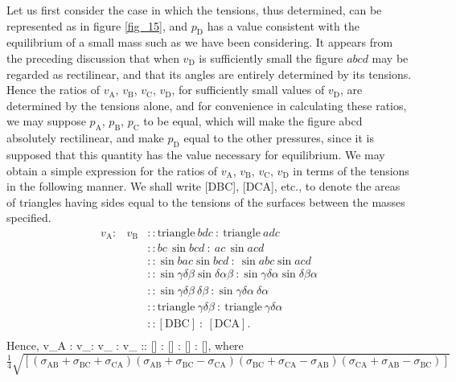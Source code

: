\documentclass[12pt]{memoir}
\newcommand{\dd}{\delta}
\begin{document}
Let us first consider the case in which the tensions, thus determined, can be represented as in figure \ref{fig_15}, and $p_\text{D}$ has a value consistent with the equilibrium of a small mass such as we have been considering. It appears from  the preceding discussion that when $v_\text{D}$ is sufficiently small the figure $abcd$ may be regarded as rectilinear, and that its angles are entirely determined by its tensions. Hence the ratios of $v_\text{A}$, $v_\text{B}$, $v_\text{C}$, $v_\text{D}$, for sufficiently small values of $v_\text{D}$, are determined by the tensions alone, and for convenience in calculating these ratios, we may suppose $p_\text{A}$, $p_\text{B}$, $p_\text{C}$ to be equal, which will make the figure abcd absolutely rectilinear, and make $p_\text{D}$ equal to the other pressures, since it is supposed that this quantity has the value necessary for equilibrium. We may obtain a simple expression for the ratios of $v_\text{A}$, $v_\text{B}$, $v_\text{C}$, $v_\text{D}$ in terms of the tensions in the following manner. We shall write [DBC], [DCA], etc., to denote the areas of triangles having sides equal to the tensions of the surfaces between the masses specified.
\begin{equation*}\begin{array}{ccl}
v_\text{A}: & v_\text{B} &:: \text{triangle}\ bdc \ : \ \text{triangle} \ adc \\
 & &:: bc\, \sin bcd \ : \ ac \, \sin acd \\
& &:: \sin bac \sin bcd \ :\  \sin abc \sin acd \\
& &:: \sin \gamma \dd \beta \sin \dd \alpha \beta \ :  \sin \gamma \dd \alpha \sin \dd\beta\alpha \\
& &:: \sin \gamma \dd \beta \ \dd\beta \ : \sin \gamma \dd \alpha \ \dd\alpha \\
& &:: \text{triangle} \ \gamma \dd \beta \ : \ \text{triangle} \ \gamma \dd \alpha \\
& &:: [\text{DBC}] \ : \  [\text{DCA}]. \\
\end{array}\end{equation*}
Hence,
\eqs v_A : v_:  v_ : v_ :: [] : [] : [] : [],  \label{634} \eqe
where
$$\tfrac{1}{4} \sqrt{\left[ (\sigma_{\text{AB}}+ \sigma_{\text{BC}} +  \sigma_{\text{CA}})(\sigma_{\text{AB}} + \sigma_{\text{BC}} -  \sigma_{\text{CA}})(\sigma_{\text{BC}} +  \sigma_{\text{CA}} - \sigma_{\text{AB}})( \sigma_{\text{CA}} + \sigma_{\text{AB}} - \sigma_{\text{BC}})\right]}$$
\end{document}
